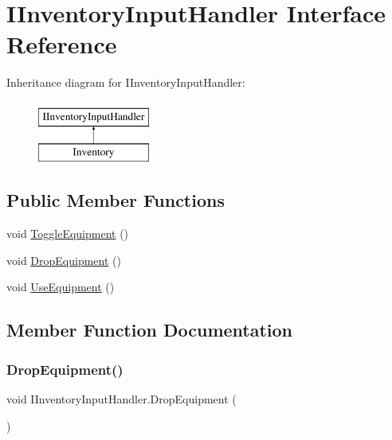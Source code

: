 \hypertarget{interface_i_inventory_input_handler}{}\section{I\+Inventory\+Input\+Handler Interface Reference}
\label{interface_i_inventory_input_handler}
Inheritance diagram for I\+Inventory\+Input\+Handler\+:\begin{figure}[H]
\begin{center}
\leavevmode
\includegraphics[height=2.000000cm]{interface_i_inventory_input_handler}
\end{center}
\end{figure}
\subsection*{Public Member Functions}
\begin{DoxyCompactItemize}
\item 
void \mbox{\hyperlink{interface_i_inventory_input_handler_abc015c2f9db63a1851e774fc404892e2}{Toggle\+Equipment}} ()
\item 
void \mbox{\hyperlink{interface_i_inventory_input_handler_a56c1457c3c9fbaf3a18e5542fa296f1a}{Drop\+Equipment}} ()
\item 
void \mbox{\hyperlink{interface_i_inventory_input_handler_af0d5cde1c1cf40e364a695e0a0660f68}{Use\+Equipment}} ()
\end{DoxyCompactItemize}


\subsection{Member Function Documentation}
\mbox{\label{interface_i_inventory_input_handler_a56c1457c3c9fbaf3a18e5542fa296f1a}} 
\subsubsection{\texorpdfstring{Drop\+Equipment()}{DropEquipment()}}
{\footnotesize\ttfamily void I\+Inventory\+Input\+Handler.\+Drop\+Equipment (\begin{DoxyParamCaption}{ }\end{DoxyParamCaption})}

